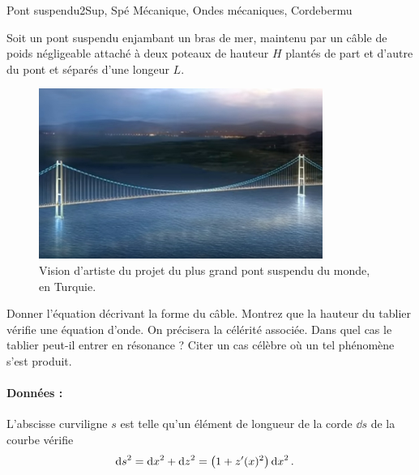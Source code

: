 
\begin{exercise}{Pont suspendu}{2}{Sup, Spé}
{Mécanique, Ondes mécaniques, Corde}{bermu}

Soit un pont suspendu enjambant un bras de mer, maintenu par un câble de poids négligeable attaché à deux poteaux de hauteur $H$ plantés de part et d'autre du pont et séparés d'une longeur $L$.

\begin{figure}[H]
    \centering
    \includegraphics[height=15em]{meca/ondes_meca/pont-suspendu.jpeg}
    \caption{Vision d'artiste du projet du plus grand pont suspendu du monde, en Turquie.}
\end{figure}

\begin{questions}
\question Donner l'équation décrivant la forme du câble.
\question Montrez que la hauteur du tablier vérifie une équation d'onde. On précisera la célérité associée.
\question Dans quel cas le tablier peut-il entrer en résonance ? Citer un cas célèbre où un tel phénomène s'est produit.
\end{questions}

\paragraph{Données :}  L’abscisse curviligne $s$ est telle qu’un élément de longueur de la corde $\dd{s}$ de la courbe vérifie
\begin{align*}
    \dd{s}^2 = \dd{x}^2 + \dd{z}^2 &= \qty(1+ z'(x)^2)\dd{x}^2.
\end{align*}
\end{exercise}
